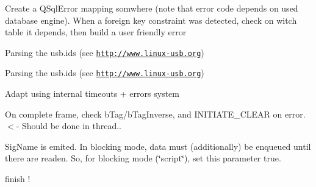 \begin{DoxyRefList}
\item[\label{todo__todo000083}%
\hypertarget{todo__todo000083}{}%
Member \hyperlink{classmdt_tt_test_node_unit_a9da3578291033f5f9d77f186fe2fb325}{mdt\-Tt\-Test\-Node\-Unit\-:\-:get\-Test\-Links\-Depending\-On\-Connection} (const Q\-Variant \&test\-Node\-Unit\-Connection\-Id, bool \&ok)]Create a Q\-Sql\-Error mapping somwhere (note that error code depends on used database engine). When a foreign key constraint was detected, check on witch table it depends, then build a user friendly error  
\item[\label{todo__todo000038}%
\hypertarget{todo__todo000038}{}%
Member \hyperlink{classmdt_usb_device_descriptor_a626afc71d8e72600f12259ac6f5a5866}{mdt\-Usb\-Device\-Descriptor\-:\-:product\-Name} () const ]Parsing the usb.\-ids (see \href{http://www.linux-usb.org}{\tt http\-://www.\-linux-\/usb.\-org})  
\item[\label{todo__todo000037}%
\hypertarget{todo__todo000037}{}%
Member \hyperlink{classmdt_usb_device_descriptor_ac2f746ebd5540b65bf00f82c991f5c3b}{mdt\-Usb\-Device\-Descriptor\-:\-:vendor\-Name} () const ]Parsing the usb.\-ids (see \href{http://www.linux-usb.org}{\tt http\-://www.\-linux-\/usb.\-org})  
\item[\label{todo__todo000039}%
\hypertarget{todo__todo000039}{}%
Member \hyperlink{classmdt_usb_port_manager_a34bf0ac118e586bf2547a98964a2230c}{mdt\-Usb\-Port\-Manager\-:\-:wait\-Readen\-Control\-Response} ()]Adapt using internal timeouts + errors system  
\item[\label{todo__todo000041}%
\hypertarget{todo__todo000041}{}%
Member \hyperlink{classmdt_usbtmc_port_manager_aca42b343ae1f6a324e6e45968f03bbea}{mdt\-Usbtmc\-Port\-Manager\-:\-:from\-Thread\-New\-Frame\-Readen} ()]On complete frame, check b\-Tag/b\-Tag\-Inverse, and I\-N\-I\-T\-I\-A\-T\-E\-\_\-\-C\-L\-E\-A\-R on error. $<$-\/ Should be done in thread..  
\item[\label{todo__todo000042}%
\hypertarget{todo__todo000042}{}%
Member \hyperlink{classmdt_usbtmc_port_manager_ab1604a1c8f2e9192714d039dbf9a5158}{mdt\-Usbtmc\-Port\-Manager\-:\-:send\-Read\-Request} (bool enqueue\-Response)]Sig\-Name is emited. In blocking mode, data must (additionally) be enqueued until there are readen. So, for blocking mode (\char`\"{}script\char`\"{}), set this parameter true.  
\item[\label{todo__todo000040}%
\hypertarget{todo__todo000040}{}%
Member \hyperlink{classmdt_usbtmc_port_manager_a7bcc280bd4a26ed523832550b1e61553}{mdt\-Usbtmc\-Port\-Manager\-:\-:send\-Read\-Status\-Byte\-Request} ()]finish ! 
\end{DoxyRefList}